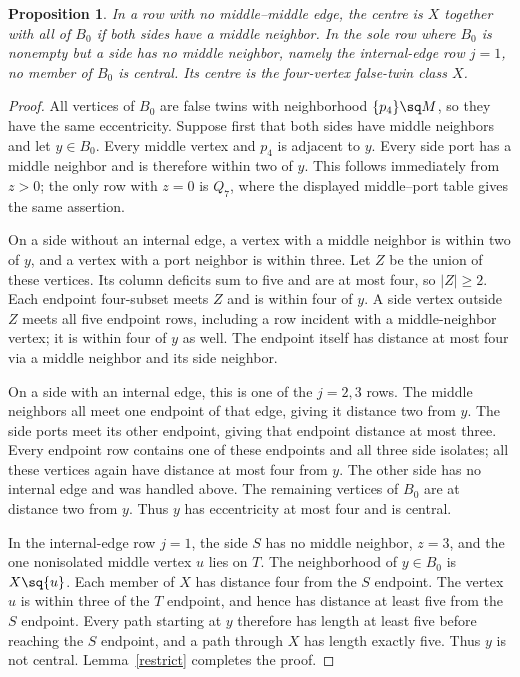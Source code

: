 \documentclass[11pt]{article}
\newtheorem{proposition}[theorem]{Proposition}
\begin{document}
\begin{proposition}\label{nomiddle}
In a row with no middle--middle edge, the centre is $X$ together with
all of $B_0$ if both sides have a middle neighbor. In the sole row
where $B_0$ is nonempty but a side has no middle neighbor, namely the
internal-edge row $j=1$, no member of $B_0$ is central. Its centre is
the four-vertex false-twin class $X$.
\end{proposition}
\begin{proof}
All vertices of $B_0$ are false twins with neighborhood
$\{p_4\}\sq M$, so they have the same eccentricity. Suppose first that
both sides have middle neighbors and let $y\in B_0$. Every middle vertex
and $p_4$ is adjacent to $y$. Every side port has a middle neighbor and
is therefore within two of $y$. This follows immediately from $z>0$;
the only row with $z=0$ is $Q_7$, where the displayed middle--port table
gives the same assertion.

On a side without an internal edge, a vertex with a middle neighbor is
within two of $y$, and a vertex with a port neighbor is within three.
Let $Z$ be the union of these vertices. Its column deficits sum to five
and are at most four, so $|Z|\geq2$. Each endpoint four-subset meets
$Z$ and is within four of $y$. A side vertex outside $Z$ meets all five
endpoint rows, including a row incident with a middle-neighbor vertex;
it is within four of $y$ as well. The endpoint itself has distance at
most four via a middle neighbor and its side neighbor.

On a side with an internal edge, this is one of the $j=2,3$ rows.
The middle neighbors all meet one endpoint of that edge, giving it
distance two from $y$. The side ports meet its other endpoint, giving
that endpoint distance at most three. Every endpoint row contains one
of these endpoints and all three side isolates; all these vertices
again have distance at most four from $y$. The other side has no
internal edge and was handled above. The remaining vertices of $B_0$
are at distance two from $y$. Thus $y$ has eccentricity at most four
and is central.

In the internal-edge row $j=1$, the side $S$ has no middle neighbor,
$z=3$, and the one nonisolated middle vertex $u$ lies on $T$.
The neighborhood of $y\in B_0$ is $X\sq\{u\}$. Each member of $X$
has distance four from the $S$ endpoint. The vertex $u$ is within
three of the $T$ endpoint, and hence has distance at least five from
the $S$ endpoint. Every path starting at $y$ therefore has length at
least five before reaching the $S$ endpoint, and a path through $X$
has length exactly five. Thus $y$ is not central. Lemma~\ref{restrict}
completes the proof.
\end{proof}
\end{document}
